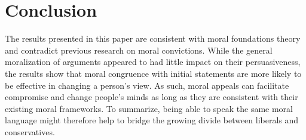 
\section{Conclusion}\label{conclusion}

The results presented in this paper are consistent with moral foundations theory and contradict previous research on moral convictions. While the general moralization of arguments appeared to had little impact on their persuasiveness, the results show that moral congruence with initial statements are more likely to be effective in changing a person's view. As such, moral appeals can facilitate compromise and change people's minds as long as they are consistent with their existing moral frameworks. To summarize, being able to speak the same moral language might therefore help to bridge the growing divide between liberals and conservatives.




